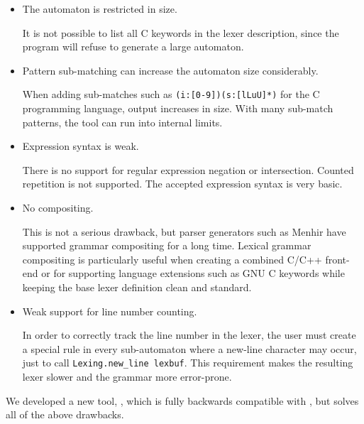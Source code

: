 \begin{itemize}

   \item The automaton is restricted in size.

      It is not possible to list all C keywords in the lexer description, since
      the program will refuse to generate a large automaton.

   \item Pattern sub-matching can increase the automaton size considerably.

      When adding sub-matches such as \verb!(i:[0-9])(s:[lLuU]*)! for the C
      programming language, \ocamllex{} output increases in size. With many
      sub-match patterns, the tool can run into internal limits.

   \item Expression syntax is weak.

      There is no support for regular expression negation or intersection.
      Counted repetition is not supported. The accepted expression syntax is
      very basic.

   \item No compositing.

      This is not a serious drawback, but parser generators such as Menhir have
      supported grammar compositing for a long time. Lexical grammar compositing
      is particularly useful when creating a combined C/C++ front-end or for
      supporting language extensions such as GNU C keywords while keeping the
      base lexer definition clean and standard.

   \item Weak support for line number counting.

      In order to correctly track the line number in the lexer, the user must
      create a special rule in every sub-automaton where a new-line character
      may occur, just to call \texttt{Lexing.new\_line lexbuf}. This requirement
      makes the resulting lexer slower and the grammar more error-prone.

\end{itemize}

We developed a new tool, \reml{}, which is fully backwards compatible with
\ocamllex{}, but solves all of the above drawbacks.

